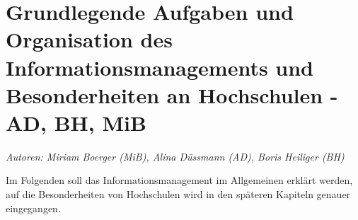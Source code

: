 \chapter{Grundlegende Aufgaben und Organisation des Informationsmanagements und Besonderheiten an Hochschulen - AD, BH, MiB}
\label{chapter_grundlagen_INM}

\textit{Autoren: Miriam Boerger (MiB), Alina Düssmann (AD), Boris Heiliger (BH)}

Im Folgenden soll das Informationsmanagement im Allgemeinen erklärt werden, auf die Besonderheiten von Hochschulen wird in den späteren Kapiteln genauer eingegangen.






